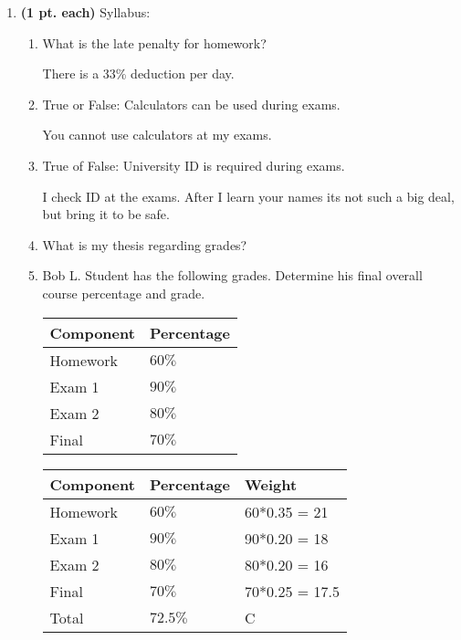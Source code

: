 \begin{enumerate}
\item {\bf (1 pt. each)} Syllabus:
	\begin{enumerate}
	\item What is the late penalty for homework?
	
	\begin{solution}{There is a 33\% deduction per day.}\end{solution}
	\item True or False: Calculators can be used during exams.
	
	\begin{solution}{You cannot use calculators at my exams.}\end{solution}
	\item True of False: University ID is required during exams.
	
	\begin{solution}{I check ID at the exams.  After I learn 
		your names its not such a big
		deal, but bring it to be safe.}\end{solution}
	\item What is my thesis regarding grades?
	\item Bob L. Student has the following grades.  Determine his final
	overall course percentage and grade.

		\begin{tabular}{l|l}
		Component & Percentage \\ \hline \hline
		Homework & $60\%$ \\ \hline
		Exam 1	 & $90\%$ \\ \hline
		Exam 2	 & $80\%$ \\ \hline
		Final	 & $70\%$ \\ 
		\end{tabular}

	\begin{solution}{
                \begin{tabular}{l|l|l}
                Component & Percentage & Weight \\ \hline \hline
                Homework & $60\%$    & 60*0.35 = 21\\ \hline
                Exam 1   & $90\%$    & 90*0.20 = 18\\ \hline
                Exam 2   & $80\%$    & 80*0.20 = 16\\ \hline
                Final    & $70\%$    & 70*0.25 = 17.5 \\ \hline
                Total    & $72.5\%$ & C \\
                \end{tabular}
}\end{solution}


\end{enumerate}
\end{enumerate}

